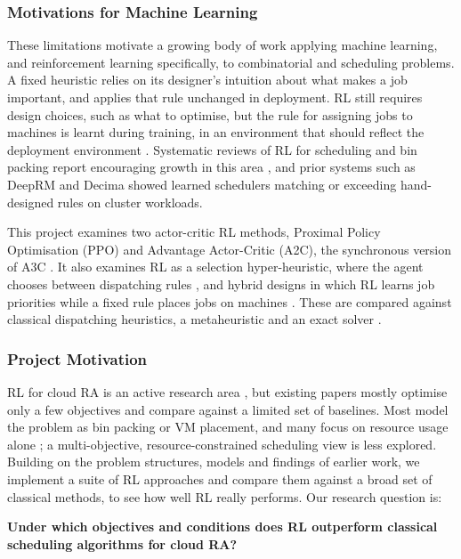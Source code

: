 \documentclass[12pt]{article}
\begin{document}
\subsubsection{Motivations for Machine Learning}
These limitations motivate a growing body of work applying machine learning, and reinforcement learning specifically, to combinatorial and scheduling problems. A fixed heuristic relies on its designer's intuition about what makes a job important, and applies that rule unchanged in deployment. RL still requires design choices, such as what to optimise, but the rule for assigning jobs to machines is learnt during training, in an environment that should reflect the deployment environment \cite{ml_ra_litrev2025}. Systematic reviews of RL for scheduling and bin packing report encouraging growth in this area \cite{DAHMANI2025100616}, and prior systems such as DeepRM \cite{mao2016deeprm} and Decima \cite{mao2019decima} showed learned schedulers matching or exceeding hand-designed rules on cluster workloads.

This project examines two actor-critic RL methods, Proximal Policy Optimisation (PPO) and Advantage Actor-Critic (A2C), the synchronous version of A3C \cite{schulman2017ppo, mnih2016a3c, konda1999actorcritic, chadia2023understandingRL}. It also examines RL as a selection hyper-heuristic, where the agent chooses between dispatching rules \cite{burke2013hyperheuristicsurvey, lassoued2026hyperheuristic, cie2025dispatchruleselection}, and hybrid designs in which RL learns job priorities while a fixed rule places jobs on machines \cite{min2022atctuning, chen2024drlgphh}. These are compared against classical dispatching heuristics, a metaheuristic and an exact solver \cite{vepsalainen1987atc, ortools}.

\subsubsection{Project Motivation}
RL for cloud RA is an active research area \cite{ml_ra_litrev2025, DAHMANI2025100616}, but existing papers mostly optimise only a few objectives and compare against a limited set of baselines. Most model the problem as bin packing or VM placement, and many focus on resource usage alone \cite{cloud_rco}; a multi-objective, resource-constrained scheduling view is less explored. Building on the problem structures, models and findings of earlier work, we implement a suite of RL approaches and compare them against a broad set of classical methods, to see how well RL really performs. Our research question is:
\begin{center}
\textbf{Under which objectives and conditions does RL outperform classical scheduling algorithms for cloud RA?}
\end{center}
\end{document}
